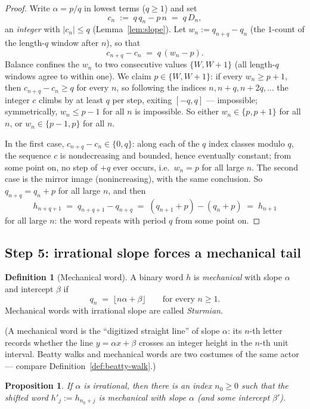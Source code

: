 \documentclass[11pt,reqno]{amsart}
\theoremstyle{plain}
\newtheorem{proposition}[theorem]{Proposition}
\theoremstyle{definition}
\newtheorem{definition}[theorem]{Definition}
\theoremstyle{remark}
\begin{document}
\begin{proof}
Write $\alpha = p/q$ in lowest terms ($q \ge 1$) and set
\[
  c_n \;:=\; q\,q_n - p\,n \;=\; q\,D_n ,
\]
an \emph{integer} with $|c_n| \le q$ (Lemma~\ref{lem:slope}). Let
$w_n := q_{n+q} - q_n$ (the $1$-count of the length-$q$ window after $n$), so that
\[
  c_{n+q} - c_n \;=\; q\,(w_n - p) .
\]
Balance confines the $w_n$ to two consecutive values $\{W, W+1\}$ (all length-$q$
windows agree to within one). We claim $p \in \{W, W{+}1\}$: if every
$w_n \ge p + 1$, then $c_{n+q} - c_n \ge q$ for every $n$, so following the indices
$n, n+q, n+2q, \dots$ the integer $c$ climbs by at least $q$ per step, exiting
$[-q, q]$ --- impossible; symmetrically, $w_n \le p - 1$ for all $n$ is impossible.
So either $w_n \in \{p, p+1\}$ for all $n$, or $w_n \in \{p-1, p\}$ for all $n$.

In the first case, $c_{n+q} - c_n \in \{0, q\}$: along each of the $q$ index classes
modulo $q$, the sequence $c$ is nondecreasing and bounded, hence eventually
constant; from some point on, no step of $+q$ ever occurs, i.e.\ $w_n = p$ for all
large $n$. The second case is the mirror image (nonincreasing), with the same
conclusion. So $q_{n+q} = q_n + p$ for all large $n$, and then
\[
  h_{n+q+1} \;=\; q_{n+q+1} - q_{n+q} \;=\; (q_{n+1} + p) - (q_n + p) \;=\; h_{n+1}
\]
for all large $n$: the word repeats with period $q$ from some point on.
\end{proof}

\subsection{Step 5: irrational slope forces a mechanical tail}

\begin{definition}[Mechanical word]\label{def:mechanical}
A binary word $h$ is \emph{mechanical} with slope $\alpha$ and intercept $\beta$ if
\[
  q_n \;=\; \lfloor n\alpha + \beta \rfloor \qquad \text{for every } n \ge 1 .
\]
Mechanical words with irrational slope are called \emph{Sturmian}.
\end{definition}

(A mechanical word is the ``digitized straight line'' of slope $\alpha$: its $n$-th
letter records whether the line $y = \alpha x + \beta$ crosses an integer height in
the $n$-th unit interval. Beatty walks and mechanical words are two costumes of the
same actor --- compare Definition~\ref{def:beatty-walk}.)

\begin{proposition}\label{prop:irrational-case}
If $\alpha$ is irrational, then there is an index $n_0 \ge 0$ such that the shifted
word $h'_j := h_{n_0 + j}$ is mechanical with slope $\alpha$ (and some intercept
$\beta'$).
\end{proposition}
\end{document}
